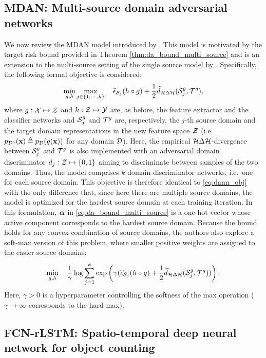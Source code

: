 \subsection{MDAN: Multi-source domain adversarial networks}
\label{sec:da_sensors_mdan}
We now review the MDAN model introduced by \citet{Zhao2018}. This model is motivated by the target risk bound provided in Theorem \ref{thm:da_bound_multi_source} and is an extension to the multi-source setting of the single source model by \citet{Ganin2015}. Specifically, the following formal objective is considered:
\begin{equation}
	\min_{g,h} \max_{j \in \{1,\cdots,k\}} \quad \widehat{\epsilon}_{{\mathcal{S}}_j}(h \circ g) + \frac{1}{2} \widehat{d}_{{\mathcal{H}} \Delta {\mathcal{H}}}({\mathcal{S}}^g_j, {\mathcal{T}}^g),
\end{equation}
where $g: {\mathcal{X}} \mapsto {\mathcal{Z}}$ and $h: {\mathcal{Z}} \mapsto {\mathcal{Y}}$ are, as before, the feature extractor and the classifier networks and ${\mathcal{S}}^g_j$ and ${\mathcal{T}}^g$ are, respectively, the $j$-th source domain and the target domain representations in the new feature space ${\mathcal{Z}}$ (i.e.\ $p_{{\mathcal{D}}^g}({\mathbf{x}}) \triangleq p_{\mathcal{D}}(g({\mathbf{x}}))$ for any domain ${\mathcal{D}}$). Here, the empirical ${\mathcal{H}} \Delta {\mathcal{H}}$-divergence between ${\mathcal{S}}^g_j$ and ${\mathcal{T}}^g$ is also implemented with an adversarial domain discriminator $d_j:{\mathcal{Z}} \mapsto \{0,1\}$ aiming to discriminate between samples of the two domains. Thus, the model comprises $k$ domain discriminator networks, i.e.\ one for each source domain. This objective is therefore identical to \eqref{eq:dann_obj} with the only difference that, since here there are multiple source domains, the model is optimized for the hardest source domain at each training iteration. In this formulation, ${\bm{\alpha}}$ in \eqref{eq:da_bound_multi_source} is a one-hot vector whose active component corresponds to the hardest source domain. Because the bound holds for any convex combination of source domains, the authors also explore a soft-max version of this problem, where smaller positive weights are assigned to the easier source domains:
\begin{equation}
\min_{g,h} \quad \frac{1}{\gamma} \log \sum_{j=1}^{k} \exp \left( \gamma( \widehat{\epsilon}_{{\mathcal{S}}_j}(h \circ g) + \frac{1}{2} \widehat{d}_{{\mathcal{H}} \Delta {\mathcal{H}}}({\mathcal{S}}^g_j, {\mathcal{T}}^g)) \right).
\end{equation}
Here, $\gamma > 0$ is a hyperparameter controlling the softness of the max operation ($\gamma \to \infty$ corresponds to the hard-max).

\subsection{FCN-rLSTM: Spatio-temporal deep neural network for object counting}
\label{sec:da_sensors_fcn_rltsm}

